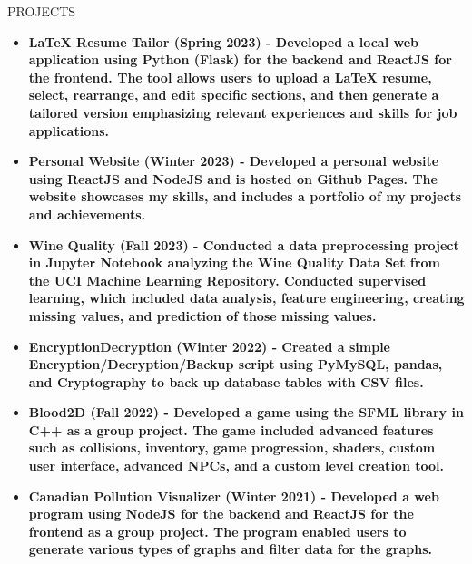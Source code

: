 \documentclass{resume}
\begin{document}
\begin{rSection}{PROJECTS}
\\
\begin{itemize}
    \itemsep -3pt {} 
     \item \bf LaTeX Resume Tailor (Spring 2023) - \normalfont Developed a local web application using Python (Flask) for the backend and ReactJS for the frontend. The tool allows users to upload a LaTeX resume, select, rearrange, and edit specific sections, and then generate a tailored version emphasizing relevant experiences and skills for job applications.
     \item \bf Personal Website (Winter 2023) - \normalfont Developed a personal website using ReactJS and NodeJS and is hosted on Github Pages. The website showcases my skills, and includes a portfolio of my projects and achievements.
     \item \bf Wine Quality (Fall 2023) - \normalfont Conducted a data preprocessing project in Jupyter Notebook analyzing the Wine Quality Data Set from the UCI Machine Learning Repository. Conducted supervised learning, which included data analysis, feature engineering, creating missing values, and prediction of those missing values.
     \item \bf EncryptionDecryption (Winter 2022) - \normalfont Created a simple Encryption/Decryption/Backup script using PyMySQL, pandas, and Cryptography to back up database tables with CSV files.
     \item \bf Blood2D (Fall 2022) - \normalfont Developed a game using the SFML library in C++ as a group project. The game included advanced features such as collisions, inventory, game progression, shaders, custom user interface, advanced NPCs, and a custom level creation tool.
     \item \bf Canadian Pollution Visualizer (Winter 2021) - \normalfont Developed a web program using NodeJS for the backend and ReactJS for the frontend as a group project. The program enabled users to generate various types of graphs and filter data for the graphs.
\end{itemize}
\end{rSection} 
\end{document}
